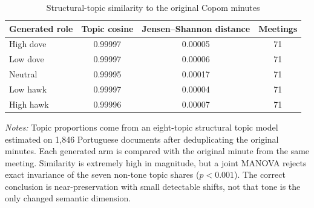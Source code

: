 \begin{table}[htbp]
\color{revisionred}
\centering
\begin{threeparttable}
\caption{Structural-topic similarity to the original Copom minutes}
\label{tab:topic-preservation}
\begin{scriptsize}
\begin{tabular}{lccc}
\toprule
Generated role & Topic cosine & Jensen--Shannon distance & Meetings \\
\midrule
High dove & 0.99997 & 0.00005 & 71 \\
Low dove & 0.99997 & 0.00006 & 71 \\
Neutral & 0.99995 & 0.00017 & 71 \\
Low hawk & 0.99997 & 0.00004 & 71 \\
High hawk & 0.99996 & 0.00007 & 71 \\
\bottomrule
\end{tabular}
\begin{tablenotes}[flushleft]
\scriptsize
\item \textit{Notes:} Topic proportions come from an eight-topic structural topic model estimated on 1,846 Portuguese documents after deduplicating the original minutes. Each generated arm is compared with the original minute from the same meeting. Similarity is extremely high in magnitude, but a joint MANOVA rejects exact invariance of the seven non-tone topic shares ($p<0.001$). The correct conclusion is near-preservation with small detectable shifts, not that tone is the only changed semantic dimension.
\end{tablenotes}
\end{scriptsize}
\end{threeparttable}
\end{table}
